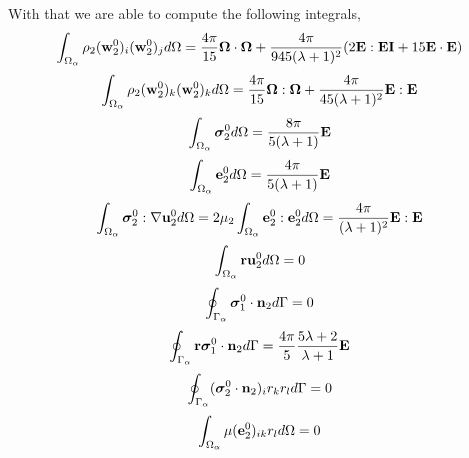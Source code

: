With that we are able to compute the following integrals,
\begin{equation*}
    \int_{\Omega_\alpha} \rho_2(\textbf{w}_2^0)_i (\textbf{w}_2^0)_j d\Omega
    = \frac{4\pi}{15}\bm\Omega\cdot\bm\Omega
    + \frac{4\pi}{945(\lambda+1)^2}
    (2\textbf{E}:\textbf{EI} + 15 \textbf{E}\cdot \textbf{E})
\end{equation*}
\begin{equation*}
    \int_{\Omega_\alpha} \rho_2(\textbf{w}_2^0)_k (\textbf{w}_2^0)_k d\Omega
    = \frac{4\pi}{15}\bm\Omega:\bm\Omega
    + \frac{4\pi}{45(\lambda+1)^2}
    \textbf{E}:\textbf{E} 
\end{equation*} 
\begin{equation*}
    \int_{\Omega_\alpha} \bm\sigma_2^0 d\Omega
    = \frac{8\pi}{5(\lambda+1)}
    \textbf{E}
\end{equation*}
\begin{equation*}
    \int_{\Omega_\alpha} \textbf{e}_2^0 d\Omega
    = \frac{4\pi}{5(\lambda+1)}
    \textbf{E}
\end{equation*}
\begin{equation*}
    \int_{\Omega_\alpha} \bm{\sigma}_2^0:\mathbf{\nabla} \textbf{u}_2^0 d\Omega
    = 2\mu_2 \int_{\Omega_\alpha} \textbf{e}_2^0: \textbf{e}_2^0  d\Omega
    = 
    \frac{4\pi}{(\lambda+1)^2}\textbf{E}:\textbf{E}
\end{equation*}
\begin{align*}
    \int_{\Omega_\alpha} \textbf{r}\textbf{u}_2^0 d\Omega
    = 0 
\end{align*}
\begin{equation*}
    \oint_{\Gamma_\alpha} \bm\sigma_1^0\cdot \textbf{n}_2 d\Gamma
    = 0
\end{equation*}
\begin{equation*}
    \oint_{\Gamma_\alpha} \textbf{r}\bm\sigma_1^0\cdot \textbf{n}_2 d\Gamma
    = \frac{4\pi}{5}\frac{5\lambda+2}{\lambda+1}\textbf{E} 
\end{equation*}
\begin{equation*}
    \oint_{\Gamma_\alpha} (\bm\sigma_2^0\cdot \textbf{n}_2)_i r_kr_l d\Gamma
    = 0
\end{equation*}
\begin{equation*}
    \int_{\Omega_\alpha} \mu(\textbf{e}_2^0)_{ik} r_l d\Omega =
    0
\end{equation*}